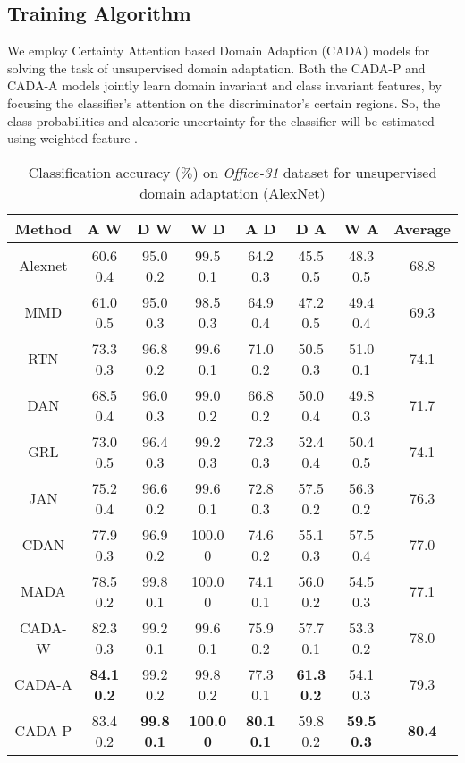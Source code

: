 \documentclass[10pt,twocolumn,letterpaper]{article}
\begin{document}
\subsection{Training Algorithm}
We employ Certainty Attention based Domain Adaption (CADA) models for solving the task of unsupervised domain adaptation. Both the CADA-P and CADA-A models jointly learn domain invariant and class invariant features, by focusing the classifier's attention on the discriminator's certain regions. So, the class probabilities  and aleatoric uncertainty  for the classifier will be estimated using weighted feature .
\begin{table*}
\centering
\caption {Classification accuracy (\%) on \textit{Office-31} dataset for unsupervised domain adaptation (AlexNet\cite{krizhevsky_NIPS2012})} 
\begin{tabular}{cccccccc}
\toprule
\textbf{Method }& A  W & D W &  W  D &A  D & D  A & W  A & Average \\ 
  \midrule
 Alexnet\cite{krizhevsky_NIPS2012}  & 60.6  0.4 & 95.0 0.2  & 99.5 0.1 &64.2  0.3& 45.5 0.5  & 48.3 0.5 & 68.8\\
  MMD\cite{tzeng_arxiv2014} & 61.0  0.5 & 95.0 0.3  & 98.5 0.3 &64.9  0.4& 47.2 0.5  & 49.4 0.4&69.3 \\ 
  RTN\cite{long_NIPS2016} & 73.3  0.3 & 96.8  0.2 & 99.6  0.1& 71.0 0.2 & 50.5 0.3  & 51.0 0.1 & 74.1\\ 
  DAN\cite{long_ICML2015} & 68.5  0.4 & 96.0  0.3 & 99.0  0.2 & 66.8 0.2 & 50.0 0.4  & 49.8 0.3 & 71.7 \\ 
  GRL \cite{ganin_ICML2015} & 73.0  0.5 & 96.4  0.3  & 99.2  0.3 & 72.3  0.3 & 52.4 0.4  & 50.4 0.5 & 74.1\\
  JAN \cite{long_ICML2017} & 75.2  0.4 & 96.6  0.2  & 99.6  0.1 & 72.8  0.3 & 57.5 0.2  & 56.3 0.2 & 76.3\\
CDAN\cite{long_arxive2017conditional} & 77.9  0.3 & 96.9  0.2 &  100.0  0 & 74.6  0.2 & 55.1 0.3  &  57.5 0.4 & 77.0\\ 
 MADA\cite{pei_arxiv2018} & 78.5  0.2 & 99.8  0.1 &  100.0  0 & 74.1  0.1 & 56.0 0.2  & 54.5 0.3 & 77.1\\ 
 \midrule
  CADA-W & 82.3 0.3 & 99.2 0.1 & 99.6  0.1& 75.9 0.2& 57.7 0.1 & 53.3 0.2 & 78.0\\ 
CADA-A & \textbf{84.1  0.2} & 99.2  0.2 &  99.8 0.2 & 77.3  0.1 & \textbf{61.3 0.2}  & 54.1 0.3 & 79.3\\ 
CADA-P & 83.4  0.2 & \textbf{99.8  0.1} &  \textbf{100.0  0} & \textbf{80.1  0.1} & 59.8 0.2  & \textbf{59.5 0.3} & \textbf{80.4}\\
 \bottomrule 
\end{tabular}
\label{tbl:alex_office_table}
\end{table*}
\end{document}
